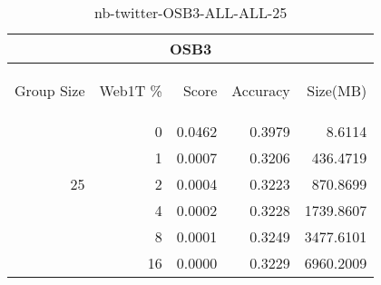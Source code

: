 \begin{center}
\begin{table}[htbp]
\begin{tabular}{ | r | r | r | r | r |}
\hline
\multicolumn{5}{|c|}{OSB3}\\
\hline
\begin{sideways}Group Size\end{sideways} & \begin{sideways}Web1T \%\end{sideways} & \begin{sideways}Score\end{sideways} & \begin{sideways}Accuracy\end{sideways} & \begin{sideways}Size(MB)\end{sideways}\\
\hline
\multirow{5}{*}{25}
 & 0 & 0.0462 & 0.3979 & 8.6114\\ \cline{2-5}
 & 1 & 0.0007 & 0.3206 & 436.4719\\ \cline{2-5}
 & 2 & 0.0004 & 0.3223 & 870.8699\\ \cline{2-5}
 & 4 & 0.0002 & 0.3228 & 1739.8607\\ \cline{2-5}
 & 8 & 0.0001 & 0.3249 & 3477.6101\\ \cline{2-5}
 & 16 & 0.0000 & 0.3229 & 6960.2009\\ \cline{2-5}
\hline
\end{tabular}
\caption{nb-twitter-OSB3-ALL-ALL-25}
\label{table:nb-twitter-OSB3-ALL-ALL-25}
\end{table}
\end{center}

